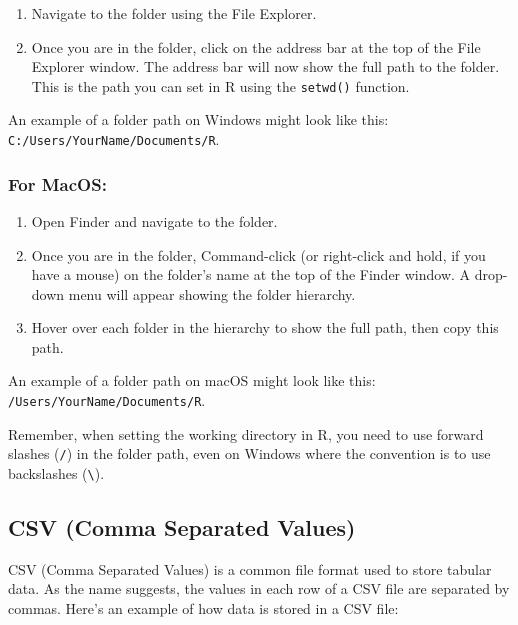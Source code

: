 \documentclass[
]{book}
\providecommand{\tightlist}{%
  \setlength{\itemsep}{0pt}\setlength{\parskip}{0pt}}
\begin{document}
\begin{enumerate}
\def\labelenumi{\arabic{enumi}.}
\tightlist
\item
  Navigate to the folder using the File Explorer.
\item
  Once you are in the folder, click on the address bar at the top of the File Explorer window. The address bar will now show the full path to the folder. This is the path you can set in R using the \texttt{setwd()} function.
\end{enumerate}

An example of a folder path on Windows might look like this: \texttt{C:/Users/YourName/Documents/R}.

\hypertarget{for-macos-1}{%
\subsubsection*{For MacOS:}\label{for-macos-1}}

\begin{enumerate}
\def\labelenumi{\arabic{enumi}.}
\tightlist
\item
  Open Finder and navigate to the folder.
\item
  Once you are in the folder, Command-click (or right-click and hold, if you have a mouse) on the folder's name at the top of the Finder window. A drop-down menu will appear showing the folder hierarchy.
\item
  Hover over each folder in the hierarchy to show the full path, then copy this path.
\end{enumerate}

An example of a folder path on macOS might look like this: \texttt{/Users/YourName/Documents/R}.

Remember, when setting the working directory in R, you need to use forward slashes (\texttt{/}) in the folder path, even on Windows where the convention is to use backslashes (\texttt{\textbackslash{}}).

\hypertarget{csv-comma-separated-values}{%
\subsection{CSV (Comma Separated Values)}\label{csv-comma-separated-values}}

CSV (Comma Separated Values) is a common file format used to store tabular data. As the name suggests, the values in each row of a CSV file are separated by commas. Here's an example of how data is stored in a CSV file:
\end{document}
